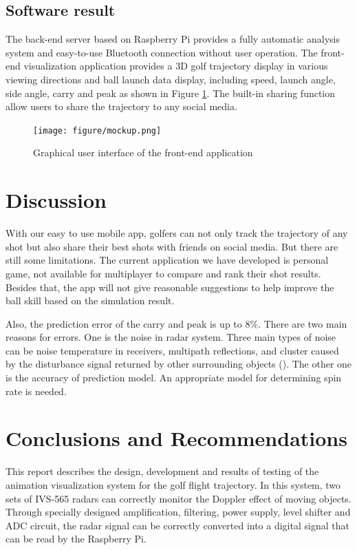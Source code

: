 \subsection{Software result}
The back-end server based on Raspberry Pi provides a fully automatic analysis system and easy-to-use Bluetooth connection without user operation. The front-end visualization application provides a 3D golf trajectory display in various viewing directions and ball launch data display, including speed, launch angle, side angle, carry and peak as shown in Figure \ref{fig:mockup}. The built-in sharing function allow users to share the trajectory to any social media. 
\begin{figure}[H]
    \centering
    \texttt{[image: figure/mockup.png]}
    \caption{Graphical user interface of the front-end application}
     \label{fig:mockup}
\end{figure}

\section{Discussion}
With our easy to use mobile app, golfers can not only track the trajectory of any shot but also share their best shots with friends on social media. But there are still some limitations. The current application we have developed is personal game, not available for multiplayer to compare and rank their shot results. Besides that, the app will not give reasonable suggestions to help improve the ball skill based on the simulation result. 

Also, the prediction error of the carry and peak is up to 8$\%$. There are two main reasons for errors. One is the noise in radar system. Three main types of noise can be noise temperature in receivers, multipath reflections, and cluster caused by the disturbance signal returned by other surrounding objects (\cite{martin2012evaluation}). The other one is the accuracy of prediction model. An appropriate model for determining spin rate is needed.


\section{Conclusions and Recommendations}
This report describes the design, development and results of testing of the animation visualization system for the golf flight trajectory. 
In this system, two sets of IVS-565 radars can correctly monitor the Doppler effect of moving objects. Through specially designed amplification, filtering, power supply, level shifter and ADC circuit, the radar signal can be correctly converted into a digital signal that can be read by the Raspberry Pi.

